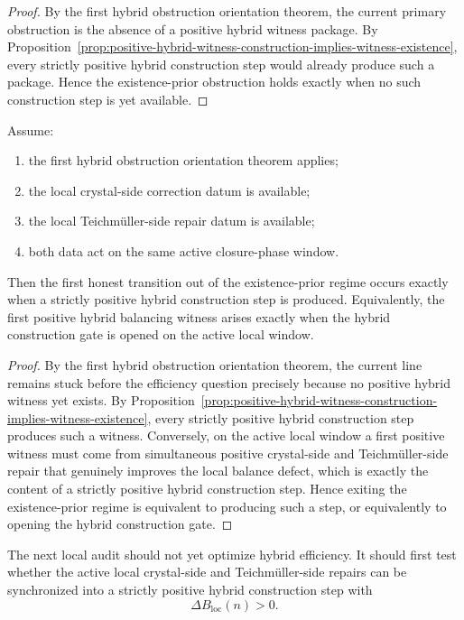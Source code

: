\begin{proof}
By the first hybrid obstruction orientation theorem, the current primary obstruction is the absence of a positive hybrid witness package.
By Proposition~\ref{prop:positive-hybrid-witness-construction-implies-witness-existence}, every strictly positive hybrid construction step would already produce such a package.
Hence the existence-prior obstruction holds exactly when no such construction step is yet available.
\end{proof}

\begin{theorem}
\label{thm:first-positive-hybrid-witness-construction-theorem}
Assume:
\begin{enumerate}[leftmargin=2em,label=(\alph*)]
  \item the first hybrid obstruction orientation theorem applies;
  \item the local crystal-side correction datum is available;
  \item the local Teichm\"uller-side repair datum is available;
  \item both data act on the same active closure-phase window.
\end{enumerate}
Then the first honest transition out of the existence-prior regime occurs exactly when a strictly positive hybrid construction step is produced.
Equivalently, the first positive hybrid balancing witness arises exactly when the hybrid construction gate is opened on the active local window.
\end{theorem}

\begin{proof}
By the first hybrid obstruction orientation theorem, the current line remains stuck before the efficiency question precisely because no positive hybrid witness yet exists.
By Proposition~\ref{prop:positive-hybrid-witness-construction-implies-witness-existence}, every strictly positive hybrid construction step produces such a witness.
Conversely, on the active local window a first positive witness must come from simultaneous positive crystal-side and Teichm\"uller-side repair that genuinely improves the local balance defect, which is exactly the content of a strictly positive hybrid construction step.
Hence exiting the existence-prior regime is equivalent to producing such a step, or equivalently to opening the hybrid construction gate.
\end{proof}

\begin{corollary}
\label{cor:current-hybrid-construction-working-rule}
The next local audit should not yet optimize hybrid efficiency.
It should first test whether the active local crystal-side and Teichm\"uller-side repairs can be synchronized into a strictly positive hybrid construction step with
\[
  \Delta B_{\mathrm{loc}}(n)>0.
\]
\end{corollary}

